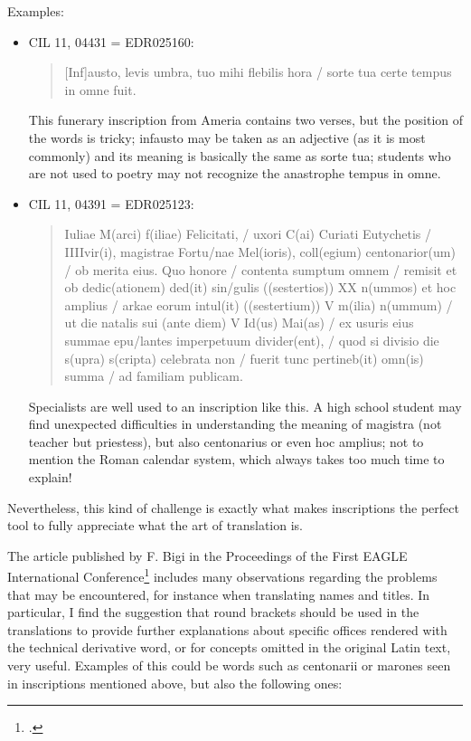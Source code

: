 \documentclass[amsthm,ebook]{saparticle}
\begin{document}
Examples:
\begin{itemize}
\item CIL 11, 04431 = EDR025160: \begin{quotation}
[Inf]austo, levis umbra, tuo mihi flebilis hora / sorte
tua certe tempus in omne fuit.

\end{quotation}
This funerary inscription from Ameria contains two verses, but the position of the words is tricky; infausto may be
taken as an adjective (as it is most commonly) and its meaning is basically the same as sorte tua; students who are not
used to poetry may not recognize the anastrophe tempus in omne.

 \item CIL 11, 04391 = EDR025123:\begin{quotation}
 Iuliae M(arci) f(iliae) Felicitati, / uxori C(ai) Curiati
Eutychetis / IIIIvir(i), magistrae Fortu/nae Mel(ioris), coll(egium) centonarior(um) / ob merita eius. Quo honore /
contenta sumptum omnem / remisit et ob dedic(ationem) ded(it) sin/gulis ((sestertios)) XX n(ummos) et hoc amplius /
arkae eorum intul(it) ((sestertium)) V m(ilia) n(ummum) / ut die natalis sui (ante diem) V Id(us) Mai(as) / ex usuris
eius summae epu/lantes imperpetuum divider(ent), / quod si divisio die s(upra) s(cripta) celebrata non / fuerit tunc
pertineb(it) omn(is) summa / ad familiam publicam. 

\end{quotation}
Specialists are well used to an inscription like this. A high school student may find unexpected difficulties in
understanding the meaning of magistra (not teacher but priestess), but also centonarius or even hoc amplius; not to
mention the Roman calendar system, which always takes too much time to explain!

\end{itemize}

Nevertheless, this kind of challenge is exactly what makes inscriptions the perfect tool to fully appreciate what the
art of translation is.

The article published by F. Bigi in the Proceedings of the First EAGLE International Conference\footnote{\citet{Bigi2014}.}
includes many observations regarding the problems that may be encountered, for instance when translating names and
titles. In particular, I find the suggestion that round brackets should be used in the translations to provide further
explanations about specific offices rendered with the technical derivative word, or for concepts omitted in the
original Latin text, very useful. Examples of this could be words such as centonarii or marones seen in inscriptions
mentioned above, but also the following ones:
\end{document}
